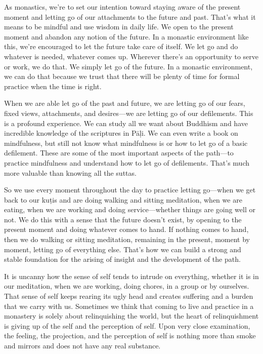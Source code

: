 As monastics, we're to set our intention toward staying aware of the 
present moment and letting go of our attachments to the future and 
past. That's what it means to be mindful and use wisdom in daily life. 
We open to the present moment and abandon any notion of the future. In 
a monastic environment like this, we're encouraged to let the future 
take care of itself. We let go and do whatever is needed, whatever 
comes up. Wherever there's an opportunity to serve or work, we do that. 
We simply let go of the future. In a monastic environment, we can do 
that because we trust that there will be plenty of time for formal 
practice when the time is right.

When we are able let go of the past and future, we are letting go of 
our fears, fixed views, attachments, and desires---we are letting go of 
our defilements. This is a profound experience. We can study all we 
want about Buddhism and have incredible knowledge of the scriptures in 
Pāḷi. We can even write a book on mindfulness, but still not know 
what mindfulness is or how to let go of a basic defilement. These are 
some of the most important aspects of the path---to practice 
mindfulness and understand how to let go of defilements. That's much 
more valuable than knowing all the suttas.

So we use every moment throughout the day to practice letting go---when 
we get back to our kuṭis and are doing walking and sitting 
meditation, when we are eating, when we are working and doing 
service---whether things are going well or not. We do this with a sense 
that the future doesn't exist, by opening to the present moment and 
doing whatever comes to hand. If nothing comes to hand, then we do 
walking or sitting meditation, remaining in the present, moment by 
moment, letting go of everything else. That's how we can build a strong 
and stable foundation for the arising of insight and the development of 
the path.


It is uncanny how the sense of self tends to intrude on everything, 
whether it is in our meditation, when we are working, doing chores, in 
a group or by ourselves. That sense of self keeps rearing its ugly head 
and creates suffering and a burden that we carry with us. Sometimes we 
think that coming to live and practice in a monastery is solely about 
relinquishing the world, but the heart of relinquishment is giving up 
of the self and the perception of self. Upon very close examination, 
the feeling, the projection, and the perception of self is nothing more 
than smoke and mirrors and does not have any real substance.

